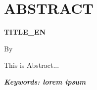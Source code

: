 \clearpage
\chapter*{ABSTRACT}

\begin{center}
  \center
  \begin{singlespace}
    \bfseries \MakeUppercase{{{TITLE_EN}}}

    \normalfont\normalsize
    By

    \bfseries \theauthor
  \end{singlespace}
\end{center}


\begin{singlespace}
  {{This is Abstract...}}
  
  \textbf{\textit{Keywords: {{lorem ipsum}}}}
\end{singlespace}

\clearpage
